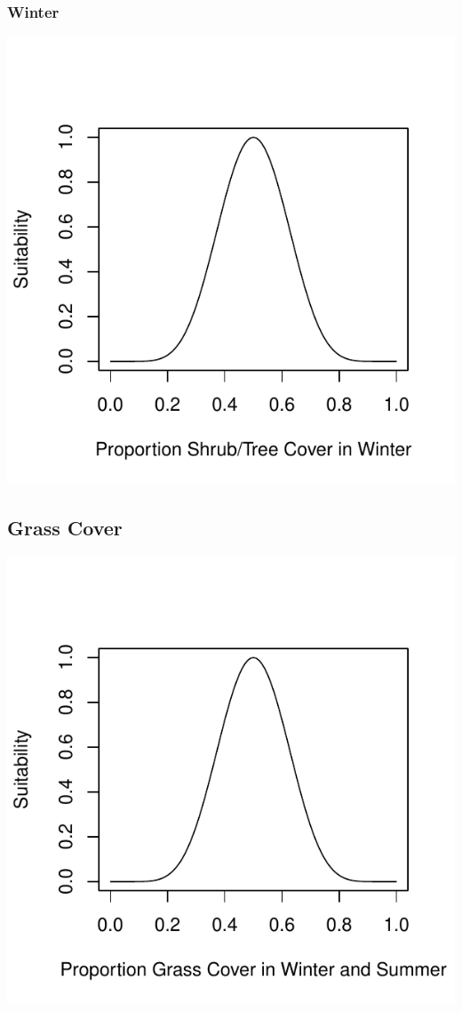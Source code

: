 \documentclass[12pt,letterpaper]{article}\usepackage{graphicx, color}
\makeatletter
\def\maxwidth{ %
  \ifdim\Gin@nat@width>\linewidth
    \linewidth
  \else
    \Gin@nat@width
  \fi
}
\newenvironment{knitrout}{}{} %
\makeatother
\begin{document}
\subsubsection{Winter}
\begin{knitrout}
\color{fgcolor}\includegraphics[width=\maxwidth]{figure/Shrub_Cover_Roy_Winter} 
\end{knitrout}

\subsection{Grass Cover}
\begin{knitrout}
\color{fgcolor}\includegraphics[width=\maxwidth]{figure/Grass_Cover_Roy} 
\end{knitrout}
\end{document}
